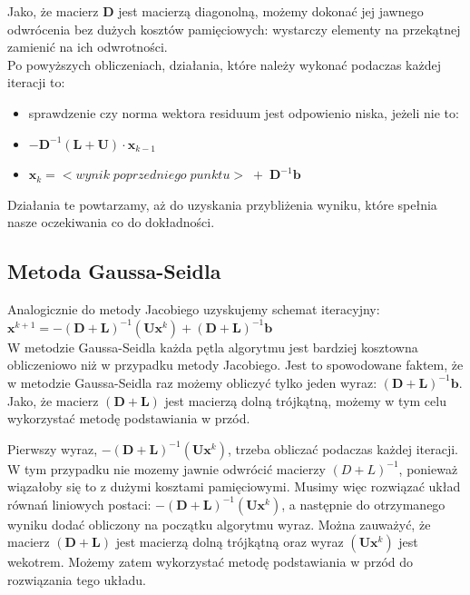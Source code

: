 \documentclass[fleqn]{article}
\begin{document}
    \noindent Jako, że macierz $\bm{D}$ jest macierzą diagonolną, 
    możemy dokonać jej jawnego odwrócenia bez dużych kosztów pamięciowych: wystarczy elementy na przekątnej zamienić na ich 
    odwrotności. \\
    
    \noindent Po powyższych obliczeniach, działania, które należy wykonać podaczas każdej iteracji to:
    \begin{itemize}
        \item sprawdzenie czy norma wektora residuum jest odpowienio niska, jeżeli nie to:
        \item $ -\bm{D}^{-1}(\bm{L} + \bm{U}) \cdot \bm{x}_{k-1}$ 
        \item $ \bm{x}_k = <wynik \; poprzedniego \; punktu> \; + \; \bm{D}^{-1}\bm{b}$
    \end{itemize}

    \noindent Działania te powtarzamy, aż do uzyskania przybliżenia wyniku, które spełnia nasze oczekiwania co do dokładności.


    \subsection{Metoda Gaussa-Seidla}
    Analogicznie do metody Jacobiego uzyskujemy schemat iteracyjny: \\ 

    $\bm{x}^{k+1} = -(\bm{D} + \bm{L})^{-1}(\bm{U}\bm{x}^k) + (\bm{D} + \bm{L})^{-1}\bm{b}$ \\

    \noindent W metodzie Gaussa-Seidla każda pętla algorytmu jest bardziej kosztowna obliczeniowo niż w przypadku metody Jacobiego.
    Jest to spowodowane faktem, że w metodzie Gaussa-Seidla raz możemy obliczyć tylko jeden wyraz: $(\bm{D} + \bm{L})^{-1}\bm{b}$.
    Jako, że macierz $(\bm{D} + \bm{L})$ jest macierzą dolną trójkątną, możemy w tym celu wykorzystać metodę podstawiania w przód.

    \noindent Pierwszy wyraz, $ -(\bm{D} + \bm{L})^{-1}(\bm{U}\bm{x}^k)$, trzeba obliczać podaczas każdej iteracji.
    W tym przypadku nie mozemy jawnie odwrócić macierzy $(D+L)^{-1}$, ponieważ wiązałoby się to z dużymi kosztami pamięciowymi.
    Musimy więc rozwiązać układ równań liniowych postaci: $ -(\bm{D} + \bm{L})^{-1}(\bm{U}\bm{x}^k)$,
    a następnie do otrzymanego wyniku dodać obliczony na początku algorytmu wyraz. Można zauważyć, że macierz $(\bm{D} + \bm{L})$
    jest macierzą dolną trójkątną oraz wyraz $(\bm{U}\bm{x}^k)$ jest wekotrem. Możemy zatem wykorzystać metodę podstawiania w przód do rozwiązania tego układu.
    
\end{document}
